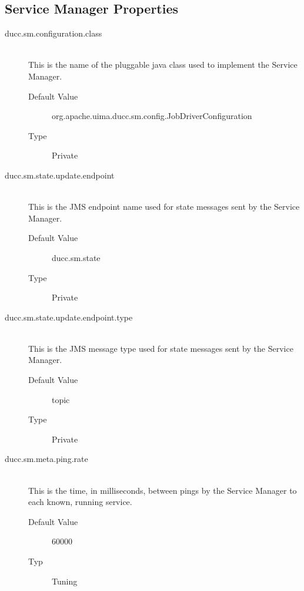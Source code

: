   



\subsection{Service Manager Properties}
    \begin{description}

      \item[ducc.sm.configuration.class] \hfill \\
        This is the name of the pluggable java class used to implement the Service Manager. 
        \begin{description}
          \item[Default Value] org.apache.uima.ducc.sm.config.JobDriverConfiguration 
          \item[Type] Private 
        \end{description}
        
      \item[ducc.sm.state.update.endpoint] \hfill \\
        This is the JMS endpoint name used for state messages sent by the Service Manager. 
        \begin{description}
          \item[Default Value] ducc.sm.state 
          \item[Type] Private
        \end{description}
        
      \item[ducc.sm.state.update.endpoint.type] \hfill \\
        This is the JMS message type used for state messages sent by the Service Manager. 
        \begin{description}
          \item[Default Value] topic 
          \item[Type] Private 
        \end{description}          
        
      \item[ducc.sm.meta.ping.rate] \hfill \\
        This is the time, in milliseconds, between pings by the Service Manager
        to each known, running service. 
        \begin{description}          
          \item[Default Value] 60000 
          \item[Typ] Tuning
        \end{description} 
        

\end{description}
